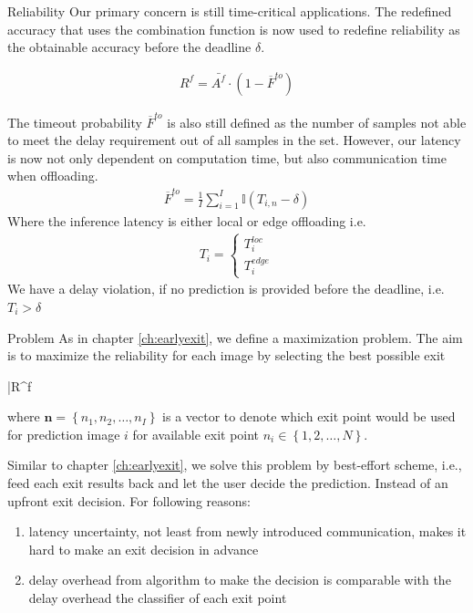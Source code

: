 \begin{enumdescript}
	\item[Reliability]  Our primary concern is still time-critical applications. The redefined accuracy that uses the combination function is now used to redefine reliability as the obtainable accuracy before the deadline $ \delta $.
	
	\begin{align}
	R^f= \bar{A^f} \cdot (1-\overline{F}^{to})
	\end{align}
	
	The timeout probability $ \overline{F}^{to} $ is also still defined as the number of samples not able to meet the delay requirement out of all samples in the set. However, our latency is now not only dependent on computation time, but also communication time when offloading.
	\begin{align}
	\overline{F}^{to}=\frac{1}{I}\sum_{i=1}^{I} \mathbb{I}\left(T_{i,n}-\delta\right)
	\end{align}
	Where the inference latency is either local or edge offloading i.e.
	\begin{align*}
	T_{i} = \begin{cases}
	T_{i}^{loc} \\
	T_{i}^{edge}
	\end{cases}
	\end{align*}
	We have a delay violation, if no prediction is provided before the deadline, i.e. $ T_{i} > \delta $  
	
	\item[Problem] As in chapter \ref{ch:earlyexit}, we define a maximization problem. The aim is to maximize the reliability for each image by selecting the best possible exit
	\begin{maxi}
		{}{\bar{R}^f}
		{}{}
	\end{maxi}
	where $ \bm{n} = \left\{ n_1, n_2, \dots, n_I \right\}$ is a vector to denote which exit point would be used for prediction image $ i $ for available exit point $ n_i \in \left\{1,2, \dots, N\right\} $.
	
	Similar to chapter \ref{ch:earlyexit}, we solve this problem by best-effort scheme, i.e., feed each exit results back and let the user decide the prediction. Instead of an upfront exit decision. For following reasons:
	\begin{enumerate}
		\item latency uncertainty, not least from newly introduced communication, makes it hard to make an exit decision in advance
		\item delay overhead from algorithm to make the decision is comparable with the delay overhead the classifier of each exit point \cite{li_edge_2018}
	\end{enumerate}
	
	
\end{enumdescript}  

